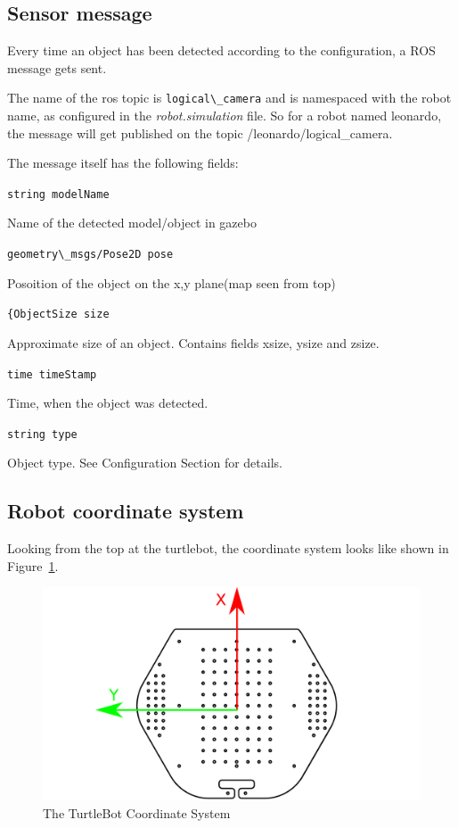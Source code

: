 \subsection{Sensor message}

Every time an object has been detected according to the configuration, a ROS message gets sent.

The name of the ros topic is \verb$logical\_camera$ and is namespaced with the robot name, as configured in the \textit{robot.simulation} file. So for a robot named leonardo, the message will get published on the topic  /leonardo/logical\_camera.

The message itself has the following fields:

\verb$string modelName$

Name of the detected model/object in gazebo

\verb$geometry\_msgs/Pose2D pose$

Posoition of the object on the x,y plane(map seen from top)

\verb${ObjectSize size$

Approximate size of an object. Contains fields xsize, ysize and zsize.

\verb$time timeStamp$

Time, when the object was detected.

\verb$string type$

Object type. See Configuration Section for details.

\subsection{Robot coordinate system}

Looking from the top at the turtlebot, the coordinate system looks like shown in Figure~\ref{fig:TurtleBotCoordinates}.
\begin{figure}[htbp]
  \includegraphics[width=1.0\textwidth]{ttbtop.pdf} 
  \caption{The TurtleBot Coordinate System}
  \label{fig:TurtleBotCoordinates}
\end{figure}

